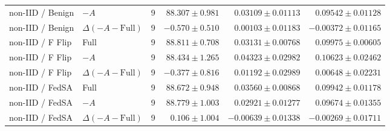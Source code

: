 \begin{table}[t]
\begin{tabular}{llrrrr}
non-IID / Benign & $-A$ & 9 & $88.307 \pm 0.981$ & $0.03109 \pm 0.01113$ & $0.09542 \pm 0.01128$ \\
non-IID / Benign & $\Delta(-A-\mathrm{Full})$ & 9 & $-0.570 \pm 0.510$ & $0.00103 \pm 0.01183$ & $-0.00372 \pm 0.01165$ \\
non-IID / F Flip & Full & 9 & $88.811 \pm 0.708$ & $0.03131 \pm 0.00768$ & $0.09975 \pm 0.00605$ \\
non-IID / F Flip & $-A$ & 9 & $88.434 \pm 1.265$ & $0.04323 \pm 0.02982$ & $0.10623 \pm 0.02462$ \\
non-IID / F Flip & $\Delta(-A-\mathrm{Full})$ & 9 & $-0.377 \pm 0.816$ & $0.01192 \pm 0.02989$ & $0.00648 \pm 0.02231$ \\
non-IID / FedSA & Full & 9 & $88.672 \pm 0.948$ & $0.03560 \pm 0.00868$ & $0.09942 \pm 0.01178$ \\
non-IID / FedSA & $-A$ & 9 & $88.779 \pm 1.003$ & $0.02921 \pm 0.01277$ & $0.09674 \pm 0.01355$ \\
non-IID / FedSA & $\Delta(-A-\mathrm{Full})$ & 9 & $0.106 \pm 1.004$ & $-0.00639 \pm 0.01338$ & $-0.00269 \pm 0.01711$ \\
\bottomrule
\end{tabular}
\end{table}

